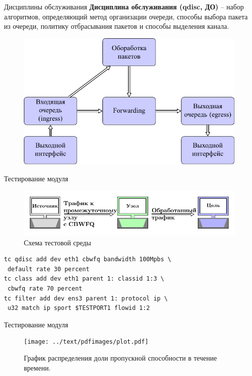 \documentclass[12pt]{beamer}
\begin{document}
\begin{frame}{Дисциплины обслуживания}
	\textbf{Дисциплина обслуживания (qdisc, ДО)} -- набор алгоритмов,
	определяющий метод организации очереди, способы выбора пакета из очереди,
	политику отбрасывания пакетов и способы выделения канала.
	\begin{figure}
		\center
    	\includegraphics[scale=0.7]{../text/pdfimages/qdisc.pdf}
	\end{figure}


\end{frame}

\begin{frame}[fragile]{Тестирование модуля}
	\begin{figure}
		\center
    	\includegraphics[scale=0.7]{../text/pdfimages/test_scheme.pdf}
		\caption*{{\footnotesize Схема тестовой среды}}
	\end{figure}
{\footnotesize
	\begin{lstlisting}[frame=single]
tc qdisc add dev eth1 cbwfq bandwidth 100Mpbs \
 default rate 30 percent
tc class add dev eth1 parent 1: classid 1:3 \
 cbwfq rate 70 percent  
tc filter add dev ens3 parent 1: protocol ip \
 u32 match ip sport $TESTPORT1 flowid 1:2

    \end{lstlisting}
}
\end{frame}

\begin{frame}{Тестирование модуля}
	\begin{figure}
		\center
    	\texttt{[image: ../text/pdfimages/plot.pdf]}
		\caption{{\scriptsize График распределения доли пропускной способности в течение времени.}}
	\end{figure}
\end{frame}
\end{document}
